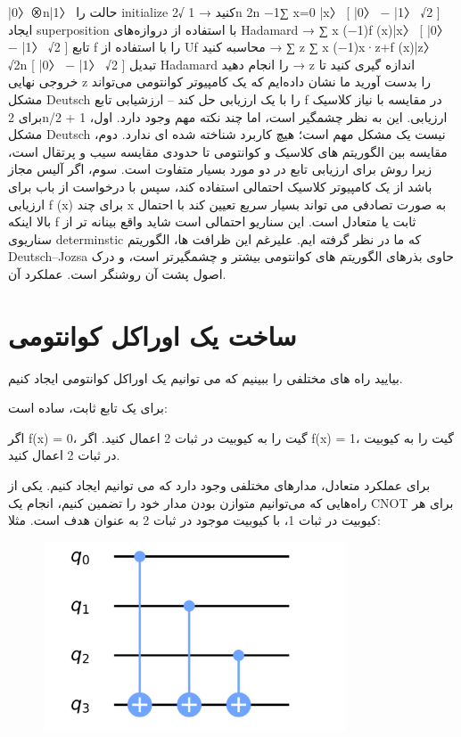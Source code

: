 \documentclass{book}
\begin{document}
	|0〉⊗n|1〉 حالت را initialize کنید
	→ 1 √2n 2n −1∑ x=0 |x〉 [ |0〉 − |1〉 √2 ] ایجاد superposition با استفاده از دروازه‌های Hadamard
	→ ∑ x (−1)f (x)|x〉 [ |0〉 − |1〉 √2 ] تابع f را با استفاده از Uf محاسبه کنید
	→ ∑ z ∑ x (−1)x·z+f (x)|z〉 √2n [ |0〉 − |1〉 √2 ] تبدیل Hadamard را انجام دهید
	→ z اندازه گیری کنید تا خروجی نهایی z را بدست آورید ما نشان داده‌ایم که یک کامپیوتر کوانتومی می‌تواند مشکل Deutsch را با یک ارزیابی حل کند – ارزشیابی تابع f در مقایسه با نیاز کلاسیک برای 2n/2 + 1 ارزیابی. این به نظر چشمگیر است، اما چند نکته مهم وجود دارد. اول، مشکل Deutsch نیست یک مشکل مهم است؛ هیچ کاربرد شناخته شده ای ندارد. دوم، مقایسه بین الگوریتم های کلاسیک و کوانتومی تا حدودی مقایسه سیب و پرتقال است، زیرا روش برای ارزیابی تابع در دو مورد بسیار متفاوت است. سوم، اگر آلیس مجاز باشد از یک کامپیوتر کلاسیک احتمالی استفاده کند، سپس با درخواست از باب برای ارزیابی f (x) برای چند x به صورت تصادفی می تواند بسیار سریع تعیین کند با احتمال بالا اینکه f ثابت یا متعادل است. این سناریو احتمالی است شاید واقع بینانه تر از سناریوی determinstic که ما در نظر گرفته ایم. علیرغم این ظرافت ها، الگوریتم Deutsch–Jozsa حاوی بذرهای الگوریتم های کوانتومی بیشتر و چشمگیرتر است، و درک اصول پشت آن روشنگر است. عملکرد آن.
	
	
	
\section{ساخت یک اوراکل کوانتومی}
بیایید راه های مختلفی را ببینیم که می توانیم یک اوراکل کوانتومی ایجاد کنیم.

برای یک تابع ثابت، ساده است:

اگر f(x) = 0، گیت را به کیوبیت در ثبات 2 اعمال کنید.
اگر f(x) = 1، گیت را به کیوبیت در ثبات 2 اعمال کنید.

برای عملکرد متعادل، مدارهای مختلفی وجود دارد که می توانیم ایجاد کنیم. یکی از راه‌هایی که می‌توانیم متوازن بودن مدار خود را تضمین کنیم، انجام یک CNOT برای هر کیوبیت در ثبات 1، با کیوبیت موجود در ثبات 2 به عنوان هدف است. مثلا:

\begin{center}
	\begin{figure}[ht]
		\centering
		\includegraphics[width=0.8\textwidth]{oraclecon.png}
		\caption{}
	\end{figure}
\end{center}
\end{document}
